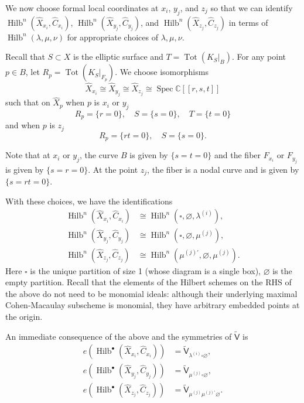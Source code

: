 \documentclass[12pt]{amsart}
\theoremstyle{definition}
\newcommand{\CC} {\mathbb{C}}          %
\newcommand{\sfVtilde}{\widetilde{\mathsf{V}}}
\newcommand{\Hilb}{\operatorname{Hilb}}
\newcommand{\Tot}{\operatorname{Tot}}
\newcommand{\Spec}{\operatorname{Spec}}
\renewcommand{\emptyset}{\varnothing}
\renewcommand{\hat}{\widehat}
\newcommand{\Xhat}{\widehat{X}}
\newcommand{\bx}{\square}
\newcommand{\mujprime}{\mu^{(j)\prime}}
\begin{document}
We now choose formal local coordinates at $x_{i}$, $y_{j}$, and
$z_{j}$ so that we can identify
$\Hilb^{n}(\Xhat_{x_{i}},\hat{C}_{x_{i}})$,
$\Hilb^{n}(\Xhat_{y_{j}},\hat{C}_{y_{j}})$, and
$\Hilb^{n}(\Xhat_{z_{j}},\hat{C}_{z_{j}})$ in terms of
$\Hilb^{n}(\lambda ,\mu ,\nu )$ for appropriate choices of $\lambda
,\mu ,\nu$. 


Recall that $S\subset X$ is the elliptic surface and $T=\Tot
(K_{S}|_{B}).$ For any point $p\in B$, let $R_{p} =\Tot
(K_{S}|_{F_{p}})$. We choose isomorphisms 
\[
\Xhat_{x_{i}} \cong \Xhat_{y_{j}} \cong \Xhat_{z_{j}} \cong \Spec \CC [[r,s,t]]
\]
such that on $\Xhat_{p}$ when $p$ is $x_{i}$ or $y_{j}$
\[
R_{p} = \{r=0 \},\quad S=\{s=0 \}, \quad T=\{t=0 \}
\]
and when $p$ is $z_{j}$ 
\[
R_{p}=\{rt=0 \}, \quad S=\{s=0 \}.
\]

Note that at $x_{i}$ or $y_{j}$, the curve $B$ is given by $\{s=t=0
\}$ and the fiber $F_{x_{i}}$ or $F_{y_{j}}$ is given by $\{s=r=0
\}$. At the point $z_{j}$, the fiber is a nodal curve and is given by
$\{s=rt=0 \}$.

With these choices, we have the identifications
\begin{align*}
\Hilb^{n}\left(\Xhat_{x_{i}},\hat{C}_{x_{i}} \right)&\cong
\Hilb^{n}\left(\bx ,\emptyset ,\lambda^{(i)} \right),\\
\Hilb^{n}\left(\Xhat_{y_{j}},\hat{C}_{y_{j}} \right)&\cong
\Hilb^{n}\left(\bx ,\emptyset ,\mu^{(j)} \right),\\
\Hilb^{n}\left(\Xhat_{z_{j}},\hat{C}_{z_{j}} \right)&\cong
\Hilb^{n}\left(\mujprime ,\emptyset ,\mu^{(j)} \right).
\end{align*}
Here $\bx$ is the unique partition of size 1 (whose diagram is a
single box), $\emptyset$ is the empty partition. Recall that the
elements of the Hilbert schemes on the RHS of the above do not need to
be monomial ideals: although their underlying maximal Cohen-Macaulay
subscheme is monomial, they have arbitrary embedded points at the
origin.

An immediate consequence of the above and the symmetries of
$\sfVtilde$ is 
\begin{align}\label{eqn: e(Hilb(Xhat,Chat)=vertex}
e\left(\Hilb^{\bullet}\left(\Xhat_{x_{i}},\hat{C}_{x_{i}} \right) \right)&=
\sfVtilde_{\lambda^{(i)} \bx  \emptyset }, \\
e\left(\Hilb^{\bullet}\left(\Xhat_{y_{j}},\hat{C}_{y_{j}} \right) \right)&=
\sfVtilde_{ \mu^{(j)} \bx \emptyset }, \nonumber \\
e\left(\Hilb^{\bullet}\left(\Xhat_{z_{j}},\hat{C}_{z_{j}} \right) \right)&=
\sfVtilde_{\mu^{(j)} \mujprime \emptyset  }. \nonumber
\end{align}
\end{document}
